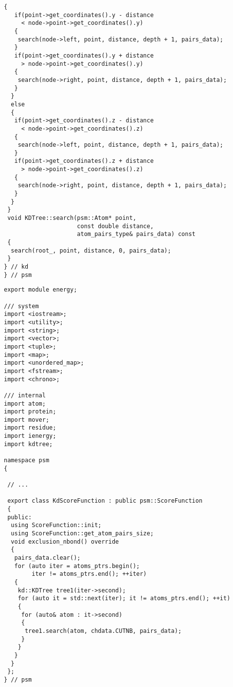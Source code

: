 \begin{lstlisting}[caption={Реализация модуля k-d дерево}, captionpos=b]
  {
   if(point->get_coordinates().y - distance 
     < node->point->get_coordinates().y)
   {
    search(node->left, point, distance, depth + 1, pairs_data);
   }
   if(point->get_coordinates().y + distance 
     > node->point->get_coordinates().y)
   {
    search(node->right, point, distance, depth + 1, pairs_data);
   }
  }
  else
  {
   if(point->get_coordinates().z - distance 
     < node->point->get_coordinates().z)
   {
    search(node->left, point, distance, depth + 1, pairs_data);
   }
   if(point->get_coordinates().z + distance 
     > node->point->get_coordinates().z)
   {
    search(node->right, point, distance, depth + 1, pairs_data);
   }
  }
 }
 void KDTree::search(psm::Atom* point,
                     const double distance, 
                     atom_pairs_type& pairs_data) const
 {
  search(root_, point, distance, 0, pairs_data);
 }
} // kd
} // psm
\end{lstlisting}


\newpage


\begin{lstlisting}[caption={Реализация оценочной функции с использованием k-d дерева}, captionpos=b]
export module energy;

/// system
import <iostream>;
import <utility>;
import <string>;
import <vector>;
import <tuple>;
import <map>;
import <unordered_map>;
import <fstream>;
import <chrono>;

/// internal
import atom;
import protein;
import mover;
import residue;
import ienergy;
import kdtree;

namespace psm
{

 // ...

 export class KdScoreFunction : public psm::ScoreFunction
 {
 public:
  using ScoreFunction::init;
  using ScoreFunction::get_atom_pairs_size; 
  void exclusion_nbond() override
  {
   pairs_data.clear();
   for (auto iter = atoms_ptrs.begin(); 
        iter != atoms_ptrs.end(); ++iter)
   {
    kd::KDTree tree1(iter->second); 
    for (auto it = std::next(iter); it != atoms_ptrs.end(); ++it)
    {
     for (auto& atom : it->second)
     {
      tree1.search(atom, chdata.CUTNB, pairs_data);
     }
    }
   }
  }
 };
} // psm
\end{lstlisting}